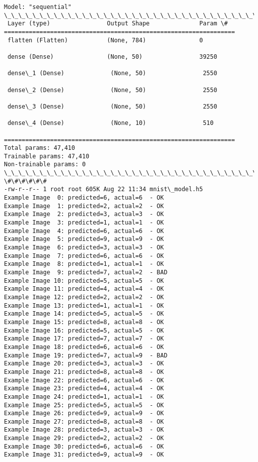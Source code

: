 \documentclass[11pt]{article}
\begin{document}
    \begin{Verbatim}[commandchars=\\\{\}]
Model: "sequential"
\_\_\_\_\_\_\_\_\_\_\_\_\_\_\_\_\_\_\_\_\_\_\_\_\_\_\_\_\_\_\_\_\_\_\_\_\_\_\_\_\_\_\_\_\_\_\_\_\_\_\_\_\_\_\_\_\_\_\_\_\_\_\_\_\_
 Layer (type)                Output Shape              Param \#
=================================================================
 flatten (Flatten)           (None, 784)               0

 dense (Dense)               (None, 50)                39250

 dense\_1 (Dense)             (None, 50)                2550

 dense\_2 (Dense)             (None, 50)                2550

 dense\_3 (Dense)             (None, 50)                2550

 dense\_4 (Dense)             (None, 10)                510

=================================================================
Total params: 47,410
Trainable params: 47,410
Non-trainable params: 0
\_\_\_\_\_\_\_\_\_\_\_\_\_\_\_\_\_\_\_\_\_\_\_\_\_\_\_\_\_\_\_\_\_\_\_\_\_\_\_\_\_\_\_\_\_\_\_\_\_\_\_\_\_\_\_\_\_\_\_\_\_\_\_\_\_
\#\#\#\#\#\#
-rw-r--r-- 1 root root 605K Aug 22 11:34 mnist\_model.h5
Example Image  0: predicted=6, actual=6  - OK
Example Image  1: predicted=2, actual=2  - OK
Example Image  2: predicted=3, actual=3  - OK
Example Image  3: predicted=1, actual=1  - OK
Example Image  4: predicted=6, actual=6  - OK
Example Image  5: predicted=9, actual=9  - OK
Example Image  6: predicted=3, actual=3  - OK
Example Image  7: predicted=6, actual=6  - OK
Example Image  8: predicted=1, actual=1  - OK
Example Image  9: predicted=7, actual=2  - BAD
Example Image 10: predicted=5, actual=5  - OK
Example Image 11: predicted=4, actual=4  - OK
Example Image 12: predicted=2, actual=2  - OK
Example Image 13: predicted=1, actual=1  - OK
Example Image 14: predicted=5, actual=5  - OK
Example Image 15: predicted=8, actual=8  - OK
Example Image 16: predicted=5, actual=5  - OK
Example Image 17: predicted=7, actual=7  - OK
Example Image 18: predicted=6, actual=6  - OK
Example Image 19: predicted=7, actual=9  - BAD
Example Image 20: predicted=3, actual=3  - OK
Example Image 21: predicted=8, actual=8  - OK
Example Image 22: predicted=6, actual=6  - OK
Example Image 23: predicted=4, actual=4  - OK
Example Image 24: predicted=1, actual=1  - OK
Example Image 25: predicted=5, actual=5  - OK
Example Image 26: predicted=9, actual=9  - OK
Example Image 27: predicted=8, actual=8  - OK
Example Image 28: predicted=3, actual=3  - OK
Example Image 29: predicted=2, actual=2  - OK
Example Image 30: predicted=6, actual=6  - OK
Example Image 31: predicted=9, actual=9  - OK
    \end{Verbatim}
\end{document}
